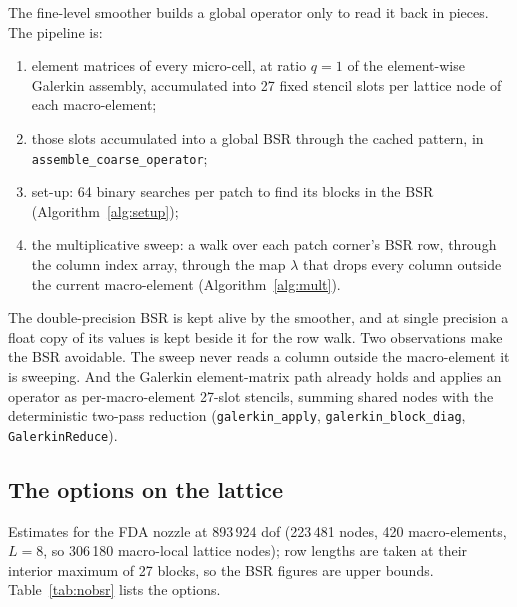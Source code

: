 \documentclass[11pt,a4paper]{article}
\newcommand{\code}[1]{\texttt{\small #1}}
\begin{document}
The fine-level smoother builds a global operator only to read it back in pieces. The pipeline is:
\begin{sloppypar}
\begin{enumerate}[leftmargin=*, itemsep=1pt]
\item element matrices of every micro-cell, at ratio $q=1$ of the element-wise Galerkin assembly,
  accumulated into 27 fixed stencil slots per lattice node of each macro-element;
\item those slots accumulated into a global BSR through the cached pattern, in
  \code{assemble\_coarse\_operator};
\item set-up: 64 binary searches per patch to find its blocks in the BSR (Algorithm~\ref{alg:setup});
\item the multiplicative sweep: a walk over each patch corner's BSR row, through the column index
  array, through the map $\lambda$ that drops every column outside the current macro-element
  (Algorithm~\ref{alg:mult}).
\end{enumerate}
\end{sloppypar}
\begin{sloppypar}
The double-precision BSR is kept alive by the smoother, and at single precision a float copy of its
values is kept beside it for the row walk. Two observations make the BSR avoidable. The sweep
never reads a column outside the macro-element it is sweeping. And the Galerkin element-matrix path
already holds and applies an operator as per-macro-element 27-slot stencils, summing shared nodes
with the deterministic two-pass reduction (\code{galerkin\_apply}, \code{galerkin\_block\_diag},
\code{GalerkinReduce}).
\end{sloppypar}

\subsection{The options on the lattice}

Estimates for the FDA nozzle at 893\,924 dof (223\,481 nodes, 420 macro-elements, $L=8$, so
306\,180 macro-local lattice nodes); row lengths are taken at their interior maximum of 27 blocks,
so the BSR figures are upper bounds. Table~\ref{tab:nobsr} lists the options.
\end{document}
